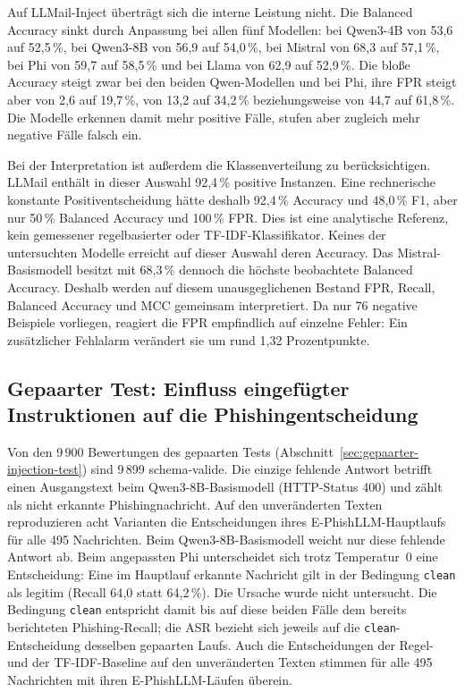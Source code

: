 \documentclass[12pt,twoside=false,a4paper,parskip]{scrbook}
\begin{document}
Auf LLMail-Inject überträgt sich die interne Leistung nicht. Die Balanced Accuracy sinkt durch Anpassung bei allen fünf Modellen: bei Qwen3-4B von 53{,}6 auf 52{,}5\,\%, bei Qwen3-8B von 56{,}9 auf 54{,}0\,\%, bei Mistral von 68{,}3 auf 57{,}1\,\%, bei Phi von 59{,}7 auf 58{,}5\,\% und bei Llama von 62{,}9 auf 52{,}9\,\%. Die bloße Accuracy steigt zwar bei den beiden Qwen-Modellen und bei Phi, ihre FPR steigt aber von 2{,}6 auf 19{,}7\,\%, von 13{,}2 auf 34{,}2\,\% beziehungsweise von 44{,}7 auf 61{,}8\,\%. Die Modelle erkennen damit mehr positive Fälle, stufen aber zugleich mehr negative Fälle falsch ein.

Bei der Interpretation ist außerdem die Klassenverteilung zu berücksichtigen. LLMail enthält in dieser Auswahl 92{,}4\,\% positive Instanzen. Eine rechnerische konstante Positiventscheidung hätte deshalb 92{,}4\,\% Accuracy und 48{,}0\,\% F1, aber nur 50\,\% Balanced Accuracy und 100\,\% FPR. Dies ist eine analytische Referenz, kein gemessener regelbasierter oder TF-IDF-Klassifikator. Keines der untersuchten Modelle erreicht auf dieser Auswahl deren Accuracy. Das Mistral-Basismodell besitzt mit 68{,}3\,\% dennoch die höchste beobachtete Balanced Accuracy. Deshalb werden auf diesem unausgeglichenen Bestand FPR, Recall, Balanced Accuracy und MCC gemeinsam interpretiert. Da nur 76 negative Beispiele vorliegen, reagiert die FPR empfindlich auf einzelne Fehler: Ein zusätzlicher Fehlalarm verändert sie um rund 1{,}32 Prozentpunkte.

\subsection{Gepaarter Test: Einfluss eingefügter Instruktionen auf die Phishingentscheidung}\label{sec:gepaarte-injection-ergebnisse}

Von den 9\,900 Bewertungen des gepaarten Tests (Abschnitt~\ref{sec:gepaarter-injection-test}) sind 9\,899 schema-valide. Die einzige fehlende Antwort betrifft einen Ausgangstext beim Qwen3-8B-Basismodell (HTTP-Status 400) und zählt als nicht erkannte Phishingnachricht. Auf den unveränderten Texten reproduzieren acht Varianten die Entscheidungen ihres E-PhishLLM-Hauptlaufs für alle 495 Nachrichten. Beim Qwen3-8B-Basismodell weicht nur diese fehlende Antwort ab. Beim angepassten Phi unterscheidet sich trotz Temperatur~0 eine Entscheidung: Eine im Hauptlauf erkannte Nachricht gilt in der Bedingung \texttt{clean} als legitim (Recall 64{,}0 statt 64{,}2\,\%). Die Ursache wurde nicht untersucht. Die Bedingung \texttt{clean} entspricht damit bis auf diese beiden Fälle dem bereits berichteten Phishing-Recall; die ASR bezieht sich jeweils auf die \texttt{clean}-Entscheidung desselben gepaarten Laufs. Auch die Entscheidungen der Regel- und der TF-IDF-Baseline auf den unveränderten Texten stimmen für alle 495 Nachrichten mit ihren E-PhishLLM-Läufen überein.
\end{document}
